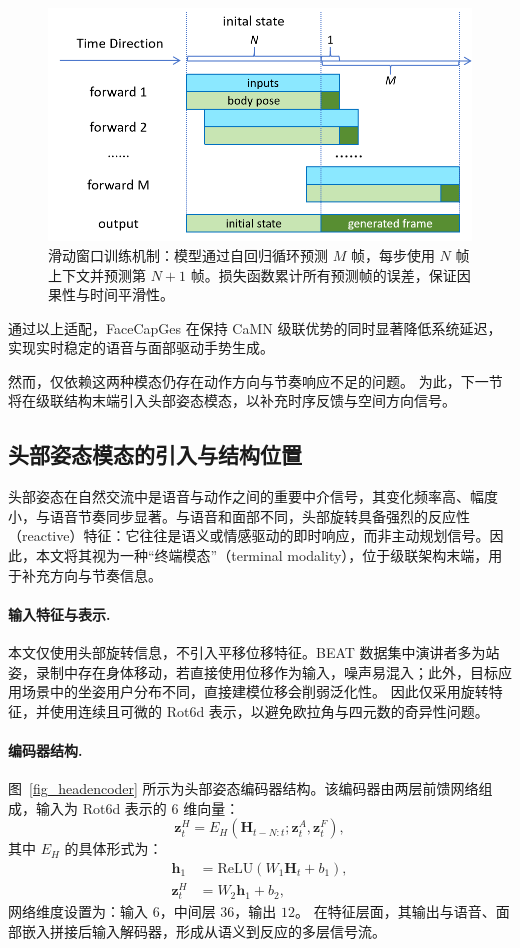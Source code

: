 \begin{figure}[h!t]
\centering
\includegraphics[width=0.75\linewidth]{figures/Fig2.png}
\caption{滑动窗口训练机制：模型通过自回归循环预测 $M$ 帧，每步使用 $N$ 帧上下文并预测第 $N+1$ 帧。损失函数累计所有预测帧的误差，保证因果性与时间平滑性。}
\label{fig2_}
\end{figure}

通过以上适配，FaceCapGes 在保持 CaMN 级联优势的同时显著降低系统延迟，
实现实时稳定的语音与面部驱动手势生成。

然而，仅依赖这两种模态仍存在动作方向与节奏响应不足的问题。
为此，下一节将在级联结构末端引入头部姿态模态，以补充时序反馈与空间方向信号。

\subsection{头部姿态模态的引入与结构位置}

头部姿态在自然交流中是语音与动作之间的重要中介信号，其变化频率高、幅度小，与语音节奏同步显著。与语音和面部不同，头部旋转具备强烈的反应性（reactive）特征：它往往是语义或情感驱动的即时响应，而非主动规划信号。因此，本文将其视为一种“终端模态”（terminal modality），位于级联架构末端，用于补充方向与节奏信息。

\paragraph{输入特征与表示.}
本文仅使用头部旋转信息，不引入平移位移特征。BEAT 数据集中演讲者多为站姿，录制中存在身体移动，若直接使用位移作为输入，噪声易混入；此外，目标应用场景中的坐姿用户分布不同，直接建模位移会削弱泛化性。  
因此仅采用旋转特征，并使用连续且可微的 Rot6d 表示，以避免欧拉角与四元数的奇异性问题。

\paragraph{编码器结构.}
图~\ref{fig_headencoder} 所示为头部姿态编码器结构。该编码器由两层前馈网络组成，输入为 Rot6d 表示的 6 维向量：
\begin{equation}
\mathbf{z}^{H}_t = E_H(\mathbf{H}_{t-N:t}; \mathbf{z}^A_t, \mathbf{z}^F_t),
\end{equation}
其中 $E_H$ 的具体形式为：
\begin{align}
\mathbf{h}_1 &= \mathrm{ReLU}(W_1 \mathbf{H}_t + b_1), \\
\mathbf{z}^{H}_t &= W_2 \mathbf{h}_1 + b_2,
\end{align}
网络维度设置为：输入 $6$，中间层 $36$，输出 $12$。  
在特征层面，其输出与语音、面部嵌入拼接后输入解码器，形成从语义到反应的多层信号流。

